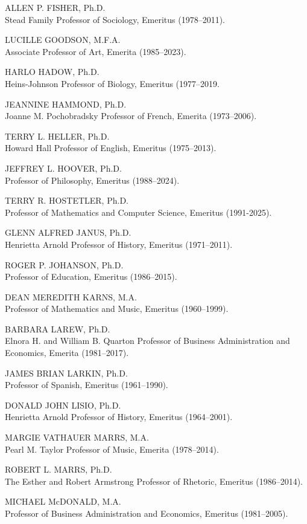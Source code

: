 \documentclass[
  letterpaper,
]{scrbook}
\begin{document}
ALLEN P. FISHER, Ph.D.\\
Stead Family Professor of Sociology, Emeritus (1978--2011).

LUCILLE GOODSON, M.F.A.\\
Associate Professor of Art, Emerita (1985--2023).

HARLO HADOW, Ph.D.\\
Heins-Johnson Professor of Biology, Emeritus (1977--2019.

JEANNINE HAMMOND, Ph.D.\\
Joanne M. Pochobradsky Professor of French, Emerita (1973--2006).

TERRY L. HELLER, Ph.D.\\
Howard Hall Professor of English, Emeritus (1975--2013).

JEFFREY L. HOOVER, Ph.D.\\
Professor of Philosophy, Emeritus (1988--2024).

TERRY R. HOSTETLER, Ph.D.\\
Professor of Mathematics and Computer Science, Emeritus (1991-2025).

GLENN ALFRED JANUS, Ph.D.\\
Henrietta Arnold Professor of History, Emeritus (1971--2011).

ROGER P. JOHANSON, Ph.D.\\
Professor of Education, Emeritus (1986--2015).

DEAN MEREDITH KARNS, M.A.\\
Professor of Mathematics and Music, Emeritus (1960--1999).

BARBARA LAREW, Ph.D.\\
Elnora H. and William B. Quarton Professor of Business Administration
and Economics, Emerita (1981--2017).

JAMES BRIAN LARKIN, Ph.D.\\
Professor of Spanish, Emeritus (1961--1990).

DONALD JOHN LISIO, Ph.D.\\
Henrietta Arnold Professor of History, Emeritus (1964--2001).

MARGIE VATHAUER MARRS, M.A.\\
Pearl M. Taylor Professor of Music, Emerita (1978--2014).

ROBERT L. MARRS, Ph.D.\\
The Esther and Robert Armstrong Professor of Rhetoric, Emeritus
(1986--2014).

MICHAEL McDONALD, M.A.\\
Professor of Business Administration and Economics, Emeritus
(1981--2005).
\end{document}
